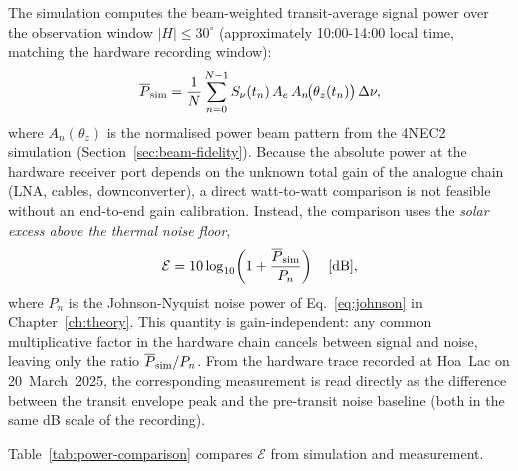 The simulation computes the beam-weighted transit-average signal power over the
observation window $|H|\leq30^\circ$ (approximately 10:00-14:00 local time,
matching the hardware recording window):
\begin{equation}
  \overline{P}_{\rm sim} = \frac{1}{N}\sum_{n=0}^{N-1}
    S_\nu(t_n)\,A_e\,A_n\!\bigl(\theta_z(t_n)\bigr)\,\Delta\nu,
  \label{eq:pavg-sim}
\end{equation}
where $A_n(\theta_z)$ is the normalised power beam pattern from the 4NEC2 simulation
(Section~\ref{sec:beam-fidelity}). Because the absolute power at the hardware receiver
port depends on the unknown total gain of the analogue chain (LNA, cables,
downconverter), a direct watt-to-watt comparison is not feasible without an
end-to-end gain calibration. Instead, the comparison uses the \emph{solar excess above
the thermal noise floor},
\begin{equation}
  \mathcal{E} = 10\log_{10}\!\left(1 + \frac{\overline{P}_{\rm sim}}{P_n}\right)
  \quad[\mathrm{dB}],
  \label{eq:excess}
\end{equation}
where $P_n$ is the Johnson-Nyquist noise power of Eq.~\eqref{eq:johnson} in
Chapter~\ref{ch:theory}. This quantity is gain-independent: any common
multiplicative factor in the hardware chain cancels between signal and noise,
leaving only the ratio $\overline{P}_{\rm sim}/P_n$.
From the hardware trace recorded at Hoa~Lac on 20~March~2025, the corresponding
measurement is read directly as the difference between the transit envelope peak and
the pre-transit noise baseline (both in the same dB scale of the recording).

Table~\ref{tab:power-comparison} compares $\mathcal{E}$ from simulation and measurement.

